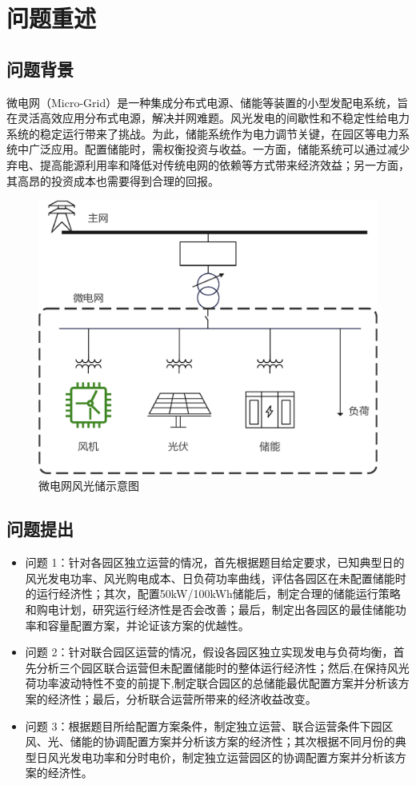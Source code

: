 \documentclass{cumcmthesis}
\begin{document}
\section{问题重述}
\subsection{问题背景}
微电网（Micro-Grid）是一种集成分布式电源、储能等装置的小型发配电系统，旨在灵活高效应用分布式电源，解决并网难题。风光发电的间歇性和不稳定性给电力系统的稳定运行带来了挑战。为此，储能系统作为电力调节关键，在园区等电力系统中广泛应用。配置储能时，需权衡投资与收益。一方面，储能系统可以通过减少弃电、提高能源利用率和降低对传统电网的依赖等方式带来经济效益；另一方面，其高昂的投资成本也需要得到合理的回报。

\begin{figure}[!h]
\centering
\includegraphics[width=.5\textwidth]{figures/示意图.eps}
\caption{微电网风光储示意图}
\end{figure}

\subsection{问题提出}
\begin{itemize}
\item 问题 1：针对各园区独立运营的情况，首先根据题目给定要求，已知典型日的风光发电功率、风光购电成本、日负荷功率曲线，评估各园区在未配置储能时的运行经济性；其次，配置50kW/100kWh储能后，制定合理的储能运行策略和购电计划，研究运行经济性是否会改善；最后，制定出各园区的最佳储能功率和容量配置方案，并论证该方案的优越性。
\item 问题 2：针对联合园区运营的情况，假设各园区独立实现发电与负荷均衡，首先分析三个园区联合运营但未配置储能时的整体运行经济性；然后,在保持风光荷功率波动特性不变的前提下,制定联合园区的总储能最优配置方案并分析该方案的经济性；最后，分析联合运营所带来的经济收益改变。
\item 问题 3：根据题目所给配置方案条件，制定独立运营、联合运营条件下园区风、光、储能的协调配置方案并分析该方案的经济性；其次根据不同月份的典型日风光发电功率和分时电价，制定独立运营园区的协调配置方案并分析该方案的经济性。
\end{itemize}
\end{document}
